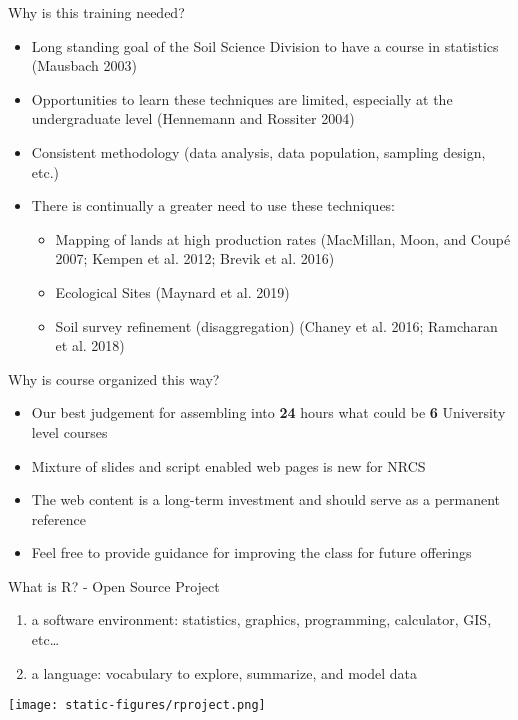 \documentclass[
  ignorenonframetext,
]{beamer}
\providecommand{\tightlist}{%
  \setlength{\itemsep}{0pt}\setlength{\parskip}{0pt}}
\begin{document}
\begin{frame}{Why is this training needed?}
\protect\hypertarget{why-is-this-training-needed}{}
\begin{itemize}
\tightlist
\item
  Long standing goal of the Soil Science Division to have a course in
  statistics (Mausbach 2003)
\item
  Opportunities to learn these techniques are limited, especially at the
  undergraduate level (Hennemann and Rossiter 2004)
\item
  Consistent methodology (data analysis, data population, sampling
  design, etc.)
\item
  There is continually a greater need to use these techniques:

  \begin{itemize}
  \tightlist
  \item
    Mapping of lands at high production rates (MacMillan, Moon, and
    Coupé 2007; Kempen et al. 2012; Brevik et al. 2016)
  \item
    Ecological Sites (Maynard et al. 2019)
  \item
    Soil survey refinement (disaggregation) (Chaney et al. 2016;
    Ramcharan et al. 2018)
  \end{itemize}
\end{itemize}
\end{frame}

\begin{frame}{Why is course organized this way?}
\protect\hypertarget{why-is-course-organized-this-way}{}
\begin{itemize}
\tightlist
\item
  Our best judgement for assembling into \textbf{24} hours what could be
  \textbf{6} University level courses
\item
  Mixture of slides and script enabled web pages is new for NRCS
\item
  The web content is a long-term investment and should serve as a
  permanent reference
\item
  Feel free to provide guidance for improving the class for future
  offerings
\end{itemize}
\end{frame}

\begin{frame}{What is R? - Open Source Project}
\protect\hypertarget{what-is-r---open-source-project}{}
\begin{enumerate}
\item
  a software environment: statistics, graphics, programming, calculator,
  GIS, etc\ldots{}
\item
  a language: vocabulary to explore, summarize, and model data
\end{enumerate}

\texttt{[image: static-figures/rproject.png]}
\end{frame}
\end{document}
